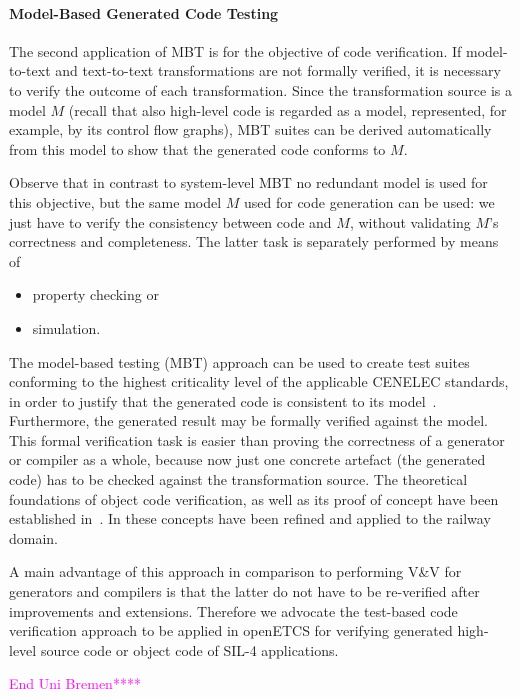 \documentclass{template/openetcs_report}
\begin{document}
\paragraph{Model-Based Generated Code Testing}
The second application of MBT is for the objective of code verification.
If model-to-text and text-to-text transformations are not formally verified, it
is necessary to verify the outcome of each transformation. Since the transformation
source is a model $M$ (recall that also high-level code is regarded as a model, represented, for example, by its control flow graphs), MBT suites can be derived automatically from this model to show that the
generated code conforms to $M$. 

Observe that in contrast to system-level MBT no redundant model is used for this objective, but the
same model $M$ used for code generation can be used: we just have to verify the consistency between 
code and $M$, without validating $M$'s correctness and completeness. The latter task is separately performed
by means of 
\begin{itemize}
\item property checking or
\item simulation.
\end{itemize}
The model-based testing (MBT) approach can be used to create test
suites conforming to the highest criticality level of the applicable
CENELEC standards, in order to justify that the generated code is
consistent to its model~\cite{PeleskaVL11Nfm,pel2011a,peleska2009d}.
Furthermore, the generated result may be formally verified against the
model. This formal verification task is easier than proving the
correctness of a generator or compiler as a whole, because now just
one concrete artefact (the generated code) has to be checked against
the transformation source. The theoretical foundations of object code
verification, as well as its proof of concept have been established
in~\cite{Pnueli98}. In
\cite{RSRSChapter2012,DBLP:journals/fac/HaxthausenPK11} these concepts
have been refined and applied to the railway domain.


A main advantage of this approach in comparison to performing V\&V for
generators and compilers is that the latter do not have to be
re-verified after improvements and extensions. Therefore we advocate
the test-based code verification approach to be applied in openETCS
for verifying generated high-level source code or object code of SIL-4
applications. 

\textcolor{magenta}{End Uni Bremen****\\ }
\end{document}
